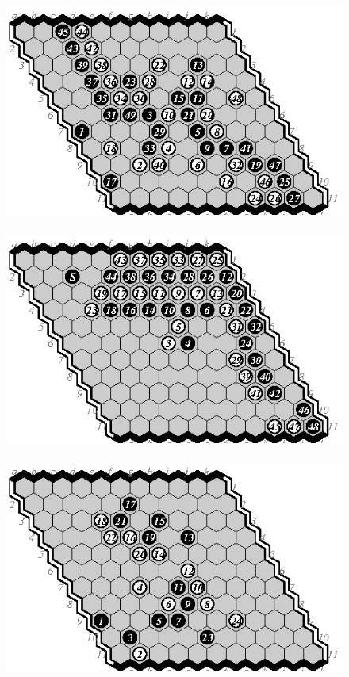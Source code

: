 \documentclass{icga}
\begin{document}
\begin{figure}[hbp]
\includegraphics[scale=.8]{pix/11.mh1.eps}\hspace*{-1.5cm}\
\includegraphics[scale=.8]{pix/11.hm2.eps}\hspace*{-1.5cm}\
\includegraphics[scale=.8]{pix/11.mh3.eps}\hspace*{-1.5cm}\

\end{figure}
\end{document}
